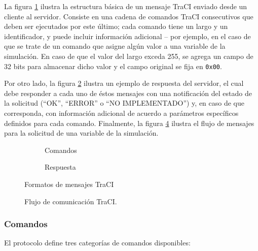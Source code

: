 La figura \ref{fig:traci_msg:command} ilustra la estructura básica de un mensaje TraCI enviado desde un cliente al servidor. Consiste en una cadena de comandos TraCI consecutivos que deben ser ejecutados por este último; cada comando tiene un largo y un identificador, y puede incluir información adicional -- por ejemplo, en el caso de que se trate de un comando que asigne algún valor a una variable de la simulación. En caso de que el valor del largo exceda 255, se agrega un campo de 32 bits para almacenar dicho valor y el campo original se fija en \texttt{0x00}.

Por otro lado, la figura \ref{fig:traci_msg:response} ilustra un ejemplo de respuesta del servidor, el cual debe responder a cada uno de éstos mensajes con una notificación del estado de la solicitud (``OK'', ``ERROR'' o ``NO IMPLEMENTADO'') y, en caso de que corresponda, con información adicional de acuerdo a parámetros específicos definidos para cada comando. Finalmente, la figura \ref{fig:tracigetversion} ilustra el flujo de mensajes para la solicitud de una variable de la simulación.

\begin{figure}[t]
    \begin{subfigure}{.3\textwidth}
        \centering
        
        \caption{Comandos}
        \label{fig:traci_msg:command}
    \end{subfigure}\hspace{0.2\textwidth}%
    \begin{subfigure}{.3\textwidth}
        \centering
        
        \caption{Respuesta}
        \label{fig:traci_msg:response}
    \end{subfigure}
    \caption{Formatos de mensajes TraCI}  
    \label{fig:traci_msg}  
\end{figure}

\begin{figure}
    \centering
    
    \caption{Flujo de comunicación TraCI.}
    \label{fig:tracigetversion}
\end{figure}


\subsubsection{Comandos}

El protocolo define tres categorías de comandos disponibles:

